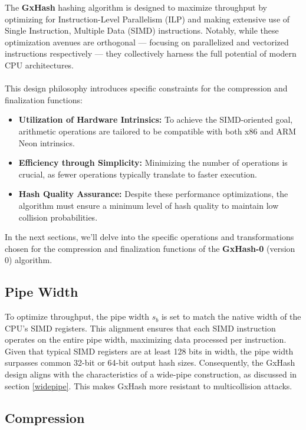 \documentclass[10pt]{article}
\begin{document}
The \textbf{GxHash} hashing algorithm is designed to maximize throughput by optimizing for Instruction-Level Parallelism (ILP) and making extensive use of Single Instruction, Multiple Data (SIMD) instructions. Notably, while these optimization avenues are orthogonal — focusing on parallelized and vectorized instructions respectively — they collectively harness the full potential of modern CPU architectures.\\\\
This design philosophy introduces specific constraints for the compression and finalization functions:

\begin{itemize}
    \item \textbf{Utilization of Hardware Intrinsics:} To achieve the SIMD-oriented goal, arithmetic operations are tailored to be compatible with both x86 and ARM Neon intrinsics.
    \item \textbf{Efficiency through Simplicity:} Minimizing the number of operations is crucial, as fewer operations typically translate to faster execution.
    \item \textbf{Hash Quality Assurance:} Despite these performance optimizations, the algorithm must ensure a minimum level of hash quality to maintain low collision probabilities.
\end{itemize}

In the next sections, we'll delve into the specific operations and transformations chosen for the compression and finalization functions of the \textbf{GxHash-0} (version 0) algorithm.

\subsection{Pipe Width}

To optimize throughput, the pipe width \( s_b \) is set to match the native width of the CPU's SIMD registers.
This alignment ensures that each SIMD instruction operates on the entire pipe width, maximizing data processed per instruction.
Given that typical SIMD registers are at least 128 bits in width, the pipe width surpasses common 32-bit or 64-bit output hash sizes.
Consequently, the GxHash design aligns with the characteristics of a wide-pipe construction, as discussed in section \ref{widepipe}.
This makes GxHash more resistant to multicollision attacks.

\subsection{Compression}
\end{document}
